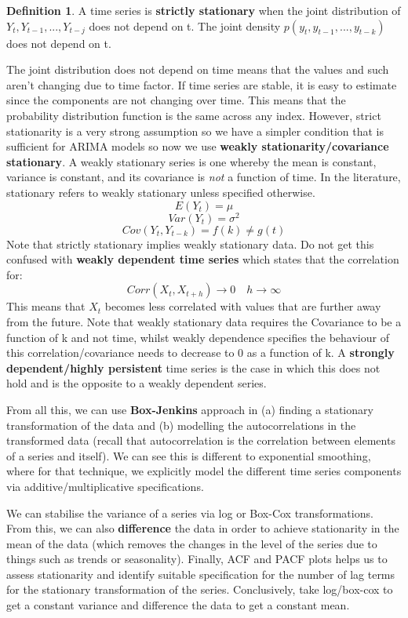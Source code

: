 \documentclass[11pt, oneside]{article}
\theoremstyle{definition}
\newtheorem{definition}{Definition}[section]
\begin{document}
\begin{definition}
  A time series is \textbf{strictly stationary} when the joint distribution of $Y_t,Y_{t-1},...,Y_{t-j}$ does not depend on t. The joint density $p(y_t,y_{t-1},...,y_{t-k})$ does not depend on t.
\end{definition}
The joint distribution does not depend on time means that the values and such aren't changing due to time factor. If time series are stable, it is easy to estimate since the components are not changing over time. This means that the probability distribution function is the same across any index. However, strict stationarity is a very strong assumption so we have a simpler condition that is sufficient for ARIMA models so now we use \textbf{weakly stationarity/covariance stationary}. A weakly stationary series is one whereby the mean is constant, variance is constant, and its covariance is \textit{not} a function of time. In the literature, stationary refers to weakly stationary unless specified otherwise.
$$
E(Y_t) = \mu
$$
$$
Var(Y_t) = \sigma^2
$$
$$
Cov(Y_t,Y_{t-k}) = f(k) \neq g(t)
$$
Note that strictly stationary implies weakly stationary data. Do not get this confused with \textbf{weakly dependent time series} which states that the correlation for:
$$
Corr(X_t,X_{t+h}) \rightarrow 0 \quad h \rightarrow \infty
$$
This means that $X_t$ becomes less correlated with values that are further away from the future. Note that weakly stationary data requires the Covariance to be a function of k and not time, whilst weakly dependence specifies the behaviour of this correlation/covariance needs to decrease to 0 as a function of k. A \textbf{strongly dependent/highly persistent} time series is the case in which this does not hold and is the opposite to a weakly dependent series.

From all this, we can use \textbf{Box-Jenkins} approach in (a) finding a stationary transformation of the data and (b) modelling the autocorrelations in the transformed data (recall that autocorrelation is the correlation between elements of a series and itself). We can see this is different to exponential smoothing, where for that technique, we explicitly model the different time series components via additive/multiplicative specifications.

We can stabilise the variance of a series via log or Box-Cox transformations. From this, we can also \textbf{difference} the data in order to achieve stationarity in the mean of the data (which removes the changes in the level of the series due to things such as trends or seasonality). Finally, ACF and PACF plots helps us to assess stationarity and identify suitable specification for the number of lag terms for the stationary transformation of the series. Conclusively, take log/box-cox to get a constant variance and difference the data to get a constant mean.
\end{document}
